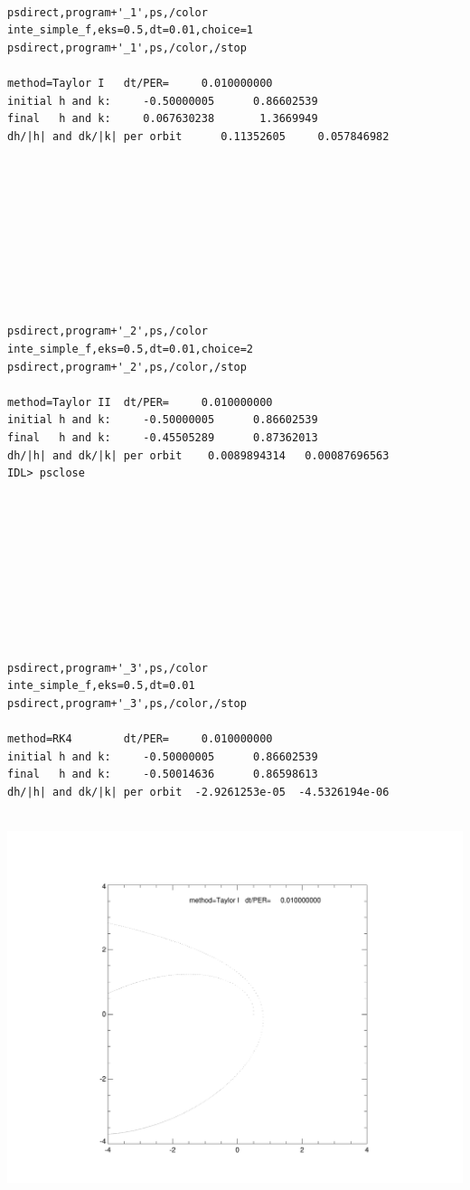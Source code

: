 \documentclass[a4paper,12pt]{article}
\begin{document}
{{ 
{\scriptsize 
\begin{verbatim}



psdirect,program+'_1',ps,/color
inte_simple_f,eks=0.5,dt=0.01,choice=1
psdirect,program+'_1',ps,/color,/stop

method=Taylor I   dt/PER=     0.010000000
initial h and k:     -0.50000005      0.86602539
final   h and k:     0.067630238       1.3669949
dh/|h| and dk/|k| per orbit      0.11352605     0.057846982










psdirect,program+'_2',ps,/color
inte_simple_f,eks=0.5,dt=0.01,choice=2
psdirect,program+'_2',ps,/color,/stop

method=Taylor II  dt/PER=     0.010000000
initial h and k:     -0.50000005      0.86602539
final   h and k:     -0.45505289      0.87362013
dh/|h| and dk/|k| per orbit    0.0089894314   0.00087696563
IDL> psclose










psdirect,program+'_3',ps,/color
inte_simple_f,eks=0.5,dt=0.01
psdirect,program+'_3',ps,/color,/stop

method=RK4        dt/PER=     0.010000000
initial h and k:     -0.50000005      0.86602539
final   h and k:     -0.50014636      0.86598613
dh/|h| and dk/|k| per orbit  -2.9261253e-05  -4.5326194e-06


\end{verbatim}
}

\vspace{-18cm}

\hspace{8cm} \includegraphics[angle=0,width=0.35\paperwidth]{inte_simple_taylor1.pdf}

}}
\end{document}
